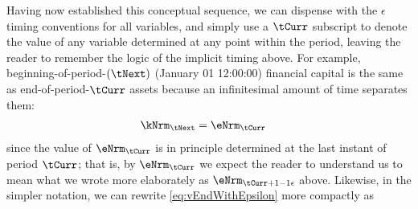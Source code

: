 \documentclass[./SolvingMicroDSOPs]{subfiles}
\begin{document}
	
	Having now established this conceptual sequence, we can dispense with the $\epsilon$ timing conventions for all variables, and simply use a $\tCurr$ subscript to denote the value of any variable determined at any point within the period, leaving the reader to remember the logic of the implicit timing above.  For example, beginning-of-period-$(\tNext)$ (January 01 12:00:00) financial capital is the same as end-of-period-$\tCurr$ assets because an infinitesimal amount of time separates them:
	\begin{align}
		\kNrm_{\tNext} & = \eNrm_{\tCurr}
	\end{align}
	since the value of $\eNrm_{\tCurr}$ is in principle determined at the last instant of period $\tCurr$; that is, by $\eNrm_{\tCurr}$ we expect the reader to understand us to mean what we wrote more elaborately as $\eNrm_{\tCurr+1-\calculatee}$ above.  Likewise, in the simpler notation, we can rewrite \eqref{eq:vEndWithEpsilon} more compactly as
	
\end{document}
